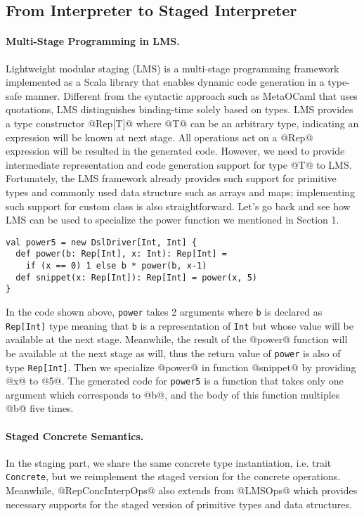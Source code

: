 \subsection{From Interpreter to Staged Interpreter} \label{stagedinterp}

\paragraph{Multi-Stage Programming in LMS.}
Lightweight modular staging (LMS) \cite{DBLP:conf/gpce/RompfO10} is a multi-stage programming framework implemented 
as a Scala library that enables dynamic code generation in a type-safe manner.
Different from the syntactic approach such as MetaOCaml \cite{DBLP:conf/flops/Kiselyov14} that uses quotations, 
LMS distinguishes binding-time solely based on types.
LMS provides a type constructor @Rep[T]@ where @T@ can be an arbitrary type, indicating an expression will be 
known at next stage. All operations act on a @Rep@ expression will be resulted in the generated code. However,
we need to provide intermediate representation and code generation support for type @T@ to LMS. 
Fortunately, the LMS framework already provides
such support for primitive types and commonly used data structure such as arrays and maps; implementing such support
for custom class is also straightforward. Let's go back and see how LMS can be used to specialize the power function
we mentioned in Section 1.

\begin{lstlisting}
val power5 = new DslDriver[Int, Int] {
  def power(b: Rep[Int], x: Int): Rep[Int] =
    if (x == 0) 1 else b * power(b, x-1)
  def snippet(x: Rep[Int]): Rep[Int] = power(x, 5)
}
\end{lstlisting}

In the code shown above, \texttt{power} takes 2 arguments where \texttt{b} is declared as \texttt{Rep[Int]} type 
meaning that \texttt{b} is a representation of \texttt{Int} but whose value will be available at the next stage. 
Meanwhile, the result of the @power@ function will be available at the next stage as will, thus the return value 
of \texttt{power} is also of type \texttt{Rep[Int]}. 
Then we specialize @power@ in function @snippet@ by providing @x@ to @5@.
The generated code for \texttt{power5} is a function that takes only one argument which corresponds to @b@,
and the body of this function multiples @b@ five times.

\paragraph{Staged Concrete Semantics.} In the staging part, we share the same concrete type instantiation, 
i.e. trait \texttt{Concrete}, but we reimplement the staged version for the concrete operations.
Meanwhile, @RepConcInterpOps@ also extends from @LMSOps@ which provides necessary supports for the 
staged version of primitive types and data structures.

